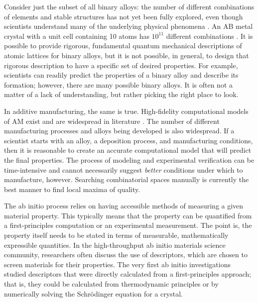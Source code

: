 Consider just the subset of all binary alloys: the number of different combinations of elements and stable structures has not yet been fully explored, even though scientists understand many of the underlying physical phenomena \cite{Pilania2013}. An AB metal crystal with a unit cell containing 10 atoms has $10^{11}$ different combinations \cite{Oganov2006}. It is possible to provide rigorous, fundamental quantum mechanical descriptions of atomic lattices for binary alloys, but it is not possible, in general, to design that rigorous description to have a specific set of desired properties. For example, scientists can readily predict the properties of a binary alloy and describe its formation; however, there are many possible binary alloys. It is often not a matter of a lack of understanding, but rather picking the right place to look.

In additive manufacturing, the same is true. High-fidelity computational models of AM exist and are widespread in literature \cite{Francois2017}. The number of different manufacturing processes and alloys being developed is also widespread. If a scientist starts with an alloy, a deposition process, and manufacturing conditions, then it is reasonable to create an accurate computational model that will predict the final properties. The process of modeling and experimental verification can be time-intensive and cannot necessarily suggest \textit{better} conditions under which to manufacture, however. Searching combinatorial spaces manually is currently the best manner to find local maxima of quality.

The ab initio process relies on having accessible methods of measuring a given material property. This typically means that the property can be quantified from a first-principles computation or an experimental measurement. The point is, the property itself needs to be stated in terms of measurable, mathematically expressible quantities. In the high-throughput ab initio materials science community, researchers often discuss the use of descriptors, which are chosen to screen materials for their properties. The very first ab initio investigations studied descriptors that were directly calculated from a first-principles approach; that is, they could be calculated from thermodynamic principles or by numerically solving the Schr\"odinger equation for a crystal.

